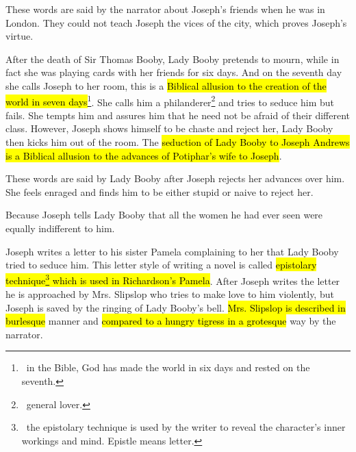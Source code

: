 \documentclass[12pt, a4paper]{article}
\begin{document}


These words are said by the narrator about Joseph's friends when he was in London.
They could not teach Joseph the vices of the city, which proves Joseph's virtue.


\ind After the death of Sir Thomas Booby, Lady Booby pretends to mourn, while in fact she was
playing cards with her friends for six days. And on the seventh day she calls Joseph to her room,
this is a \hl{Biblical allusion to the creation of the world in seven days}\footnote{\, in the Bible, God has
made the world in six days and rested on the seventh.}. She calls him
a philanderer\footnote{\, general lover.} and tries to seduce him but fails. She tempts
him and assures him that he need not be afraid of their different class. However, Joseph shows himself 
to be chaste and reject her, Lady Booby then kicks him out of the room.
The \hl{seduction of Lady Booby to Joseph Andrews is a Biblical allusion to the advances
of Potiphar's wife to Joseph}.



These words are said by Lady Booby after Joseph rejects her advances over him.
She feels enraged and finds him to be either stupid or naive to reject her.



Because Joseph tells Lady Booby that all the women he had ever seen were
equally indifferent to him.


\ind Joseph writes a letter to his sister Pamela complaining to her that Lady Booby tried to seduce him.
This letter style of writing a novel is called \hl{epistolary technique\footnote{\, the epistolary technique is used by the writer 
to reveal the character's inner workings and mind. Epistle means letter.} which is used in Richardson's
Pamela}. After Joseph writes the letter he is approached by Mrs. Slipslop who tries to make
love to him violently, but Joseph is saved by the ringing of Lady Booby's bell. \hl{Mrs. Slipslop
is described in burlesque} manner and \hl{compared to a hungry tigress in a grotesque} way by the narrator. 
\end{document}
